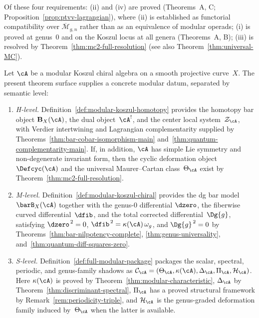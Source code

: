 \noindent
Of these four requirements: (ii) and (iv) are proved
(Theorems~A, C; Proposition~\ref{prop:ptvv-lagrangian}),
where (ii) is established as functorial compatibility over
$\overline{\mathcal{M}}_{g,n}$ rather than as an equivalence of
modular operads;
(i) is proved at genus~$0$ and on the Koszul locus at all genera
(Theorems~A, B); (iii) is resolved by
Theorem~\ref{thm:mc2-full-resolution}
(see also Theorem~\ref{thm:universal-MC}).

\begin{theorem}
\label{thm:volume-one-concrete-modular-datum}
Let $\cA$ be a modular Koszul chiral algebra on a smooth projective
curve~$X$.  The present theorem surface supplies a concrete modular
datum, separated by semantic level:
\begin{enumerate}[label=\textup{(\roman*)}]
\item \emph{H-level.}
  Definition~\ref{def:modular-koszul-homotopy} provides the
  homotopy bar object $\mathbf{B}_X(\cA)$, the dual object~$\cA^!$,
  and the center local system~$\mathcal{Z}_{\cA}$, with Verdier
  intertwining and Lagrangian complementarity supplied by
  Theorems~\ref{thm:bar-cobar-isomorphism-main}
  and~\ref{thm:quantum-complementarity-main}.  If, in addition,
  $\cA$ has simple Lie symmetry and non-degenerate invariant form,
  then the cyclic deformation object $\Defcyc(\cA)$ and the
  universal Maurer--Cartan class~$\Theta_{\cA}$ exist by
  Theorem~\ref{thm:mc2-full-resolution}.
\item \emph{M-level.}
  Definition~\ref{def:modular-koszul-chiral} provides the dg bar
  model~$\barB_X(\cA)$ together with the genus-$0$ differential
  $\dzero$, the fiberwise curved differential~$\dfib$, and the total
  corrected differential~$\Dg{g}$, satisfying
  $\dzero^{\,2} = 0$,
  $\dfib^{\,2} = \kappa(\cA)\,\omega_g$,
  and $\Dg{g}^{\,2} = 0$
  by Theorems~\ref{thm:bar-nilpotency-complete},
  \ref{thm:genus-universality},
  and~\ref{thm:quantum-diff-squares-zero}.
\item \emph{S-level.}
  Definition~\ref{def:full-modular-package} packages the scalar,
  spectral, periodic, and genus-family shadows as
  $\mathcal{C}_{\cA}
  = (\Theta_{\cA}, \kappa(\cA), \Delta_{\cA}, \Pi_{\cA},
  \mathcal{H}_{\cA})$.
  Here $\kappa(\cA)$ is proved by
  Theorem~\ref{thm:modular-characteristic},
  $\Delta_{\cA}$ by
  Theorem~\ref{thm:discriminant-spectral},
  $\Pi_{\cA}$ has a proved structural framework by
  Remark~\ref{rem:periodicity-triple},
  and $\mathcal{H}_{\cA}$ is the genus-graded deformation family
  induced by~$\Theta_{\cA}$ when the latter is available.
\end{enumerate}
\end{theorem}

